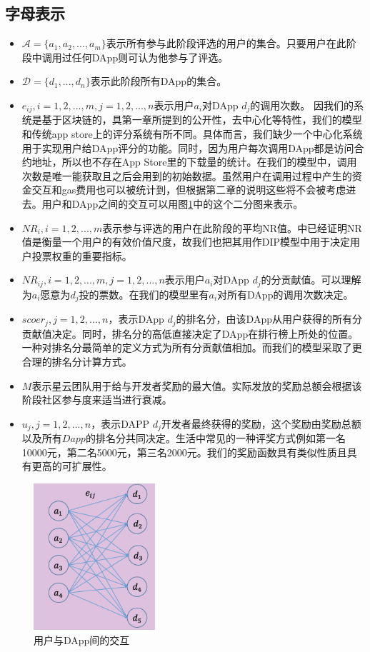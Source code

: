 \subsection{字母表示}
\begin{itemize}
	\item $\mathcal{A}=\{a_1,a_2,...,a_m\}$表示所有参与此阶段评选的用户的集合。只要用户在此阶段中调用过任何DApp则可认为他参与了评选。
	\item $\mathcal{D}=\{d_1,...,d_n\}$表示此阶段所有DApp的集合。
	\item $e_{ij},i=1,2,...,m, j=1,2,...,n$表示用户$a_i$对DApp $d_j$的调用次数。	因我们的系统是基于区块链的，具第一章所提到的公开性，去中心化等特性，我们的模型和传统app store上的评分系统有所不同。具体而言，我们缺少一个中心化系统用于实现用户给DApp评分的功能。同时，因为用户每次调用DApp都是访问合约地址，所以也不存在App Store里的下载量的统计。在我们的模型中，调用次数是唯一能获取且之后会用到的初始数据。虽然用户在调用过程中产生的资金交互和gas费用也可以被统计到，但根据第二章的说明这些将不会被考虑进去。用户和DApp之间的交互可以用图\ref{fig:interact}中的这个二分图来表示。
	\item $NR_i, i=1,2,...,m$表示参与评选的用户在此阶段的平均NR值。\cite{Nabulasyellowpaper}中已经证明NR值是衡量一个用户的有效价值尺度，故我们也把其用作DIP模型中用于决定用户投票权重的重要指标。
	\item $NR_{ij}, i=1,2,...,m,j=1,2,...,n$表示用户$a_i$对DApp $d_j$的分贡献值。可以理解为$a_i$愿意为$d_j$投的票数。在我们的模型里有$a_i$对所有DApp的调用次数决定。
	\item $scoer_j, j=1,2,...,n$，表示DApp $d_j$的排名分，由该DApp从用户获得的所有分贡献值决定。同时，排名分的高低直接决定了DApp在排行榜上所处的位置。一种对排名分最简单的定义方式为所有分贡献值相加。而我们的模型采取了更合理的排名分计算方式。
	\item $M$表示星云团队用于给与开发者奖励的最大值。实际发放的奖励总额会根据该阶段社区参与度来适当进行衰减。
	\item $u_j, j=1,2,...,n$，表示DAPP $d_j$开发者最终获得的奖励，这个奖励由奖励总额以及所有$Dapp$的排名分共同决定。生活中常见的一种评奖方式例如第一名10000元，第二名5000元，第三名2000元。我们的奖励函数具有类似性质且具有更高的可扩展性。
\end{itemize}
	 \begin{figure}
	 	\centering
	 	\includegraphics[width = 0.4\textwidth]{../common/m2.png}
	 	\caption{用户与DApp间的交互 \label{fig:interact}}
	 \end{figure}

